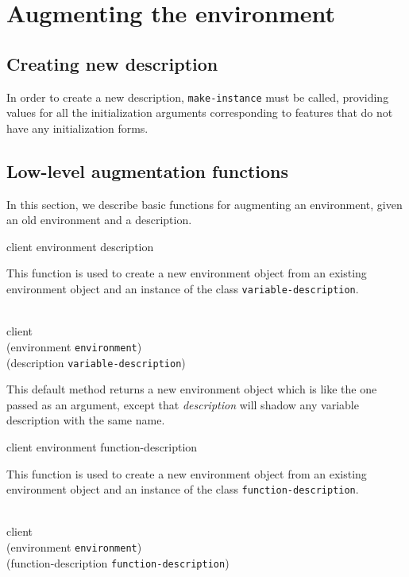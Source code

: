 \chapter{Augmenting the environment}

\section{Creating new description}

In order to create a new description, \texttt{make-instance}
must be called, providing values for all the initialization arguments
corresponding to features that do not have any initialization forms.

\section{Low-level augmentation functions}

In this section, we describe basic functions for augmenting an
environment, given an old environment and a description.

{\footnotesize
{} {client environment description}
}

This function is used to create a new environment object from an
existing environment object and an instance of the class
\texttt{variable-description}.

{\footnotesize
{}\\
           {client\\
            (environment {\tt environment})\\
            (description {\tt variable-description})}
}

This default method returns a new environment object which is like the
one passed as an argument, except that \textit{description}
will shadow any variable description with the same name.

{\footnotesize
{} {client environment function-description}
}

This function is used to create a new environment object from an
existing environment object and an instance of the class
\texttt{function-description}.

{\footnotesize
{}\\
           {client\\
            (environment {\tt environment})\\
            (function-description {\tt function-description})}
}

